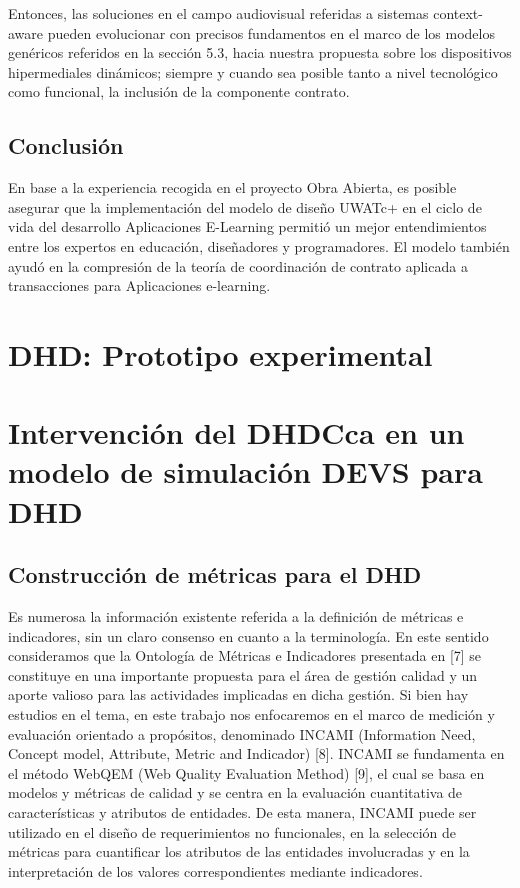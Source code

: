 Entonces, las soluciones en el campo audiovisual referidas a sistemas context-aware
pueden evolucionar con precisos fundamentos en el marco de los modelos genéricos
referidos en la sección 5.3, hacia nuestra propuesta sobre los dispositivos hipermediales
dinámicos; siempre y cuando sea posible tanto a nivel tecnológico como funcional, la
inclusión de la componente contrato.



\subsection {Conclusión}
En base a la experiencia recogida en el proyecto Obra Abierta, es posible
asegurar que la implementación del modelo de diseño UWATc+ en el ciclo de vida
del desarrollo Aplicaciones E-Learning permitió un mejor entendimientos entre
los expertos en educación, diseñadores y programadores. El modelo también ayudó
en la compresión de la teoría de coordinación de contrato aplicada a
transacciones para Aplicaciones e-learning.



\section{DHD: Prototipo experimental}


\section {Intervención del DHDCca en un modelo de simulación DEVS para DHD}


\subsection {Construcción de métricas para el DHD}

 
Es numerosa la información existente referida a la definición de métricas e indicadores, sin un claro consenso en cuanto a la terminología. En este sentido consideramos que la Ontología de Métricas e Indicadores presentada en [7] se constituye en una importante propuesta para el área de gestión calidad y un aporte valioso para las actividades implicadas en dicha gestión. Si bien hay estudios en el tema, en este trabajo nos enfocaremos en el marco de medición y evaluación orientado a propósitos, denominado INCAMI (Information Need, Concept model, Attribute, Metric and Indicador) [8]. INCAMI se fundamenta en el método WebQEM (Web Quality Evaluation Method) [9], el cual se basa en modelos y métricas de calidad y se centra en la evaluación cuantitativa de características y atributos de entidades. De esta manera, INCAMI puede ser utilizado en el diseño de requerimientos no funcionales, en la selección de métricas para cuantificar los atributos de las entidades involucradas y en la interpretación de los valores correspondientes mediante indicadores.


